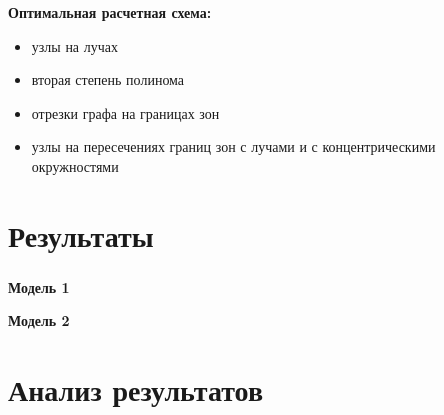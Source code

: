 \begin{frame}
\frametitle{\insertsection}

\textbf{Оптимальная расчетная схема:}
\begin{itemize}
    \item узлы на лучах
    \item вторая степень полинома
    \item отрезки графа на границах зон
    \item узлы на пересечениях границ зон с лучами и с концентрическими окружностями
\end{itemize}

\begin{minipage}[t]{0.47\linewidth}
\end{minipage}
\hfill
\begin{minipage}[t]{0.47\linewidth}
\end{minipage}
\end{frame}


\section{Результаты}

\begin{frame}
\frametitle{\insertsection}

\vspace{-0.5cm}
\begin{minipage}[t]{0.47\linewidth}
    \textbf{Модель 1}
\end{minipage}
\hfill
\begin{minipage}[t]{0.47\linewidth}
    \textbf{Модель 2}
\end{minipage}

\end{frame}


\section{Анализ результатов}

